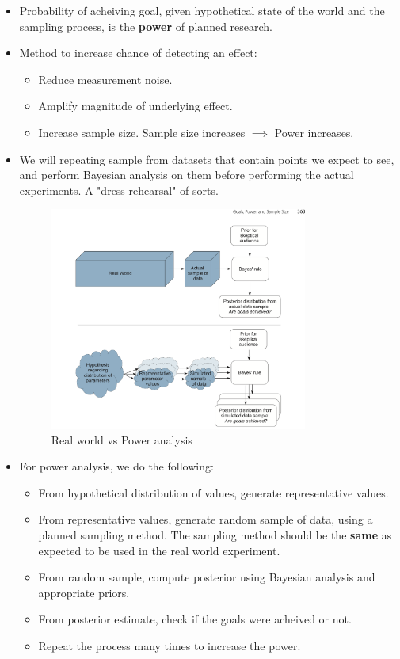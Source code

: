 \documentclass[a4paper]{article}
\begin{document}
\begin{itemize}
    \item Probability of acheiving goal, given hypothetical state of the world and the sampling process, is the \textbf{power} of planned research. 
    \item Method to increase chance of detecting an effect: 
        \begin{itemize}
            \item Reduce measurement noise.
            \item Amplify magnitude of underlying effect.
            \item Increase sample size. Sample size increases $\implies$ Power increases. 
        \end{itemize}
    \item We will repeating sample from datasets that contain points we expect to see, and perform Bayesian analysis on them before performing the actual experiments. A "dress rehearsal" of sorts.
        \begin{figure}[H]
            \centering
            \includegraphics[width=0.8\textwidth]{real_world_vs_power_analysis}
            \caption{Real world vs Power analysis}
            \label{fig:real_world_vs_power_analysis}
        \end{figure}
    \item For power analysis, we do the following:
        \begin{itemize}
            \item From hypothetical distribution of values, generate representative values.
            \item From representative values, generate random sample of data, using a planned sampling method. The sampling method should be the \textbf{same} as expected to be used in the real world experiment. 
            \item From random sample, compute posterior using Bayesian analysis and appropriate priors.
            \item From posterior estimate, check if the goals were acheived or not.
            \item Repeat the process many times to increase the power.
        \end{itemize}
\end{itemize}
\end{document}
